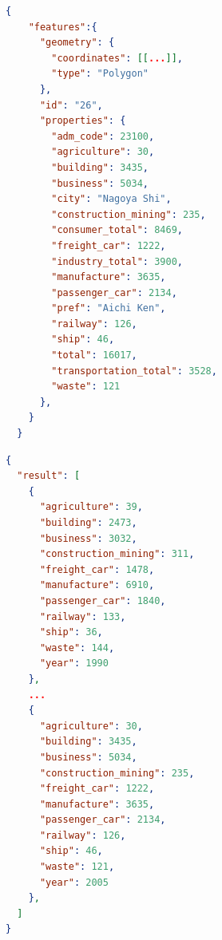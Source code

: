 \begin{lstlisting}[language=json,firstnumber=1, basicstyle=\small, caption={A response from GET /overall\_ems/municipality },captionpos=t]
  {
    "features":{
      "geometry": {
        "coordinates": [[...]],
        "type": "Polygon"
      },
      "id": "26",
      "properties": {
        "adm_code": 23100,
        "agriculture": 30,
        "building": 3435,
        "business": 5034,
        "city": "Nagoya Shi",
        "construction_mining": 235,
        "consumer_total": 8469,
        "freight_car": 1222,
        "industry_total": 3900,
        "manufacture": 3635,
        "passenger_car": 2134,
        "pref": "Aichi Ken",
        "railway": 126,
        "ship": 46,
        "total": 16017,
        "transportation_total": 3528,
        "waste": 121
      },
    }
  }
\end{lstlisting}
\begin{lstlisting}[language=json,firstnumber=1, basicstyle=\small, caption={A response from GET /overall\_ems/municipality\_ts},captionpos=t]
  {
  "result": [
    {
      "agriculture": 39,
      "building": 2473,
      "business": 3032,
      "construction_mining": 311,
      "freight_car": 1478,
      "manufacture": 6910,
      "passenger_car": 1840,
      "railway": 133,
      "ship": 36,
      "waste": 144,
      "year": 1990
    },
    ...
    {
      "agriculture": 30,
      "building": 3435,
      "business": 5034,
      "construction_mining": 235,
      "freight_car": 1222,
      "manufacture": 3635,
      "passenger_car": 2134,
      "railway": 126,
      "ship": 46,
      "waste": 121,
      "year": 2005
    },
  ]
}
\end{lstlisting}

